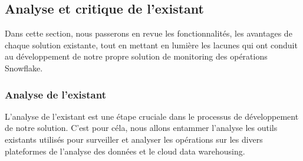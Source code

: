 \subsection{Analyse et critique de l'existant}
Dans cette section, nous passerons en revue les fonctionnalités, les avantages de chaque solution existante, tout en mettant en lumière les lacunes qui ont conduit au développement de notre propre solution de monitoring des opérations Snowflake.
\subsubsection{Analyse de l'existant}
\par L'analyse de l'existant est une étape cruciale dans le processus de développement de notre solution.
C'est pour céla, nous allons entammer l'analyse les outils existants utilisés pour surveiller et analyser les opérations sur les divers plateformes de l'analyse des données et le cloud data warehousing.
